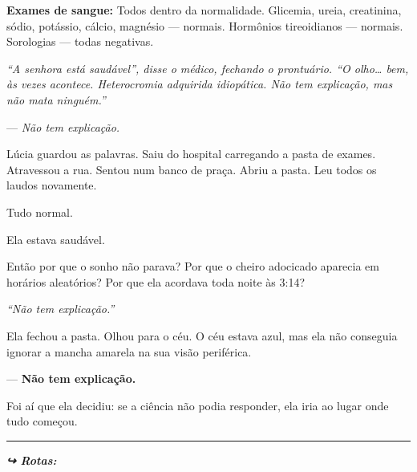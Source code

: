 \noindent \textbf{Exames de sangue:} Todos dentro da normalidade. Glicemia, ureia, creatinina, sódio, potássio, cálcio, magnésio --- normais. Hormônios tireoidianos --- normais. Sorologias --- todas negativas.

\noindent \textit{\textquotedblleft{}A senhora está saudável\textquotedblright{}\textit{, disse o médico, fechando o prontuário. }\textquotedblleft{}O olho… bem, às vezes acontece. Heterocromia adquirida idiopática. Não tem explicação, mas não mata ninguém.\textquotedblright{}}

\noindent --- \textit{Não tem explicação.}

\noindent Lúcia guardou as palavras. Saiu do hospital carregando a pasta de exames. Atravessou a rua. Sentou num banco de praça. Abriu a pasta. Leu todos os laudos novamente.

\noindent Tudo normal.

\noindent Ela estava saudável.

\noindent Então por que o sonho não parava? Por que o cheiro adocicado aparecia em horários aleatórios? Por que ela acordava toda noite às 3:14?

\noindent \textit{\textquotedblleft{}Não tem explicação.\textquotedblright{}}

\noindent Ela fechou a pasta. Olhou para o céu. O céu estava azul, mas ela não conseguia ignorar a mancha amarela na sua visão periférica.

\noindent --- \textbf{Não tem explicação.}

\noindent Foi aí que ela decidiu: se a ciência não podia responder, ela iria ao lugar onde tudo começou.

\vspace{0.5em}\noindent\rule{\textwidth}{0.5pt}\vspace{0.5em}

\vspace{0.5em}
\noindent\textit{\textbf{↪ Rotas:}  \rotasep {}}
